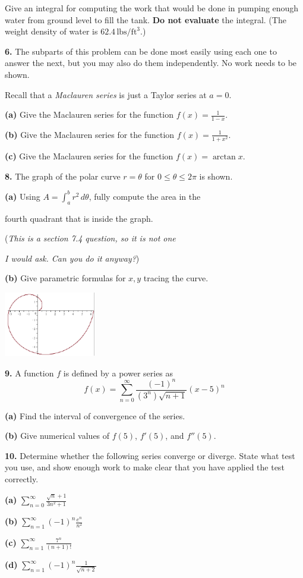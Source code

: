 \documentclass[11pt]{amsart}
\newcommand{\prob}[1]{\bigskip\bigskip\noindent\textbf{#1.}\quad }
\newcommand{\epart}[1]{\bigskip\noindent\textbf{(#1)}\quad }
\newcommand{\ds}{\displaystyle}
\begin{document}
\medskip
\noindent Give an integral for computing the work that would be done in pumping enough water from ground level to fill the tank.  \textbf{Do not evaluate} the integral.  (The weight density of water is $62.4\,\text{lbs}/\text{ft}^3$.)

\prob{6}  The subparts of this problem can be done most easily using each one to answer the next, but you may also do them independently.  No work needs to be shown.

\medskip
\noindent Recall that a \emph{Maclauren series} is just a Taylor series at $a = 0$.

\epart{a}  Give the Maclauren series for the function $\ds f(x)=\frac{1}{1-x}$.

\epart{b}  Give the Maclauren series for the function $\ds f(x)=\frac{1}{1+x^2}$.

\epart{c}  Give the Maclauren series for the function $\ds f(x)=\arctan x$.

\prob{8}  The graph of the polar curve $r=\theta$ for $0\le \theta \le 2 \pi$ is shown.

\epart{a}  Using $A=\int_a^b r^2\,d\theta$, fully compute the area in the

\hspace{5mm} fourth quadrant that is inside the graph.

\hspace{5mm} (\emph{This is a section 7.4 question, so it is not one}

\hspace{5mm} \emph{I would ask.  Can you do it anyway?})

\epart{b}  Give parametric formulas for $x,y$ tracing the curve.

\vspace{-25mm}
\hfill \includegraphics[width=0.3\textwidth]{spiral.pdf}

\prob{9}  A function $f$ is defined by a power series as
    $$f(x) = \sum_{n=0}^\infty \frac{(-1)^n}{(3^n) \sqrt{n+1}} (x-5)^n$$

\epart{a} Find the interval of convergence of the series.

\epart{b} Give numerical values of $f(5)$, $f'(5)$, and $f''(5)$.

\prob{10}  Determine whether the following series converge or diverge.  State what test you use, and show enough work to make clear that you have applied the test correctly.

\epart{a} $\ds \sum_{n=0}^\infty \frac{\sqrt{n}+1}{3n^2 + 1}$

\epart{b} $\ds \sum_{n=1}^\infty (-1)^n \frac{e^n}{n^2}$

\epart{c} $\ds \sum_{n=1}^\infty \frac{7^n}{(n+1)!}$

\epart{d} $\ds \sum_{n=1}^\infty (-1)^n \frac{1}{\sqrt{n+2}}$
\end{document}

